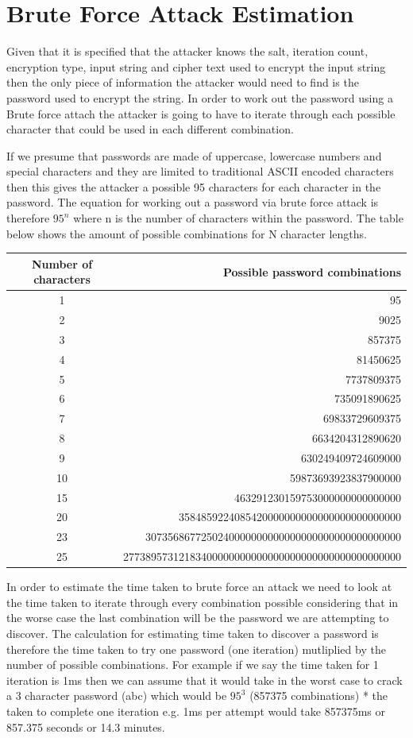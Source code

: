 \documentclass[a4paper, twoside, 11pt]{article}
\begin{document}
\section{Brute Force Attack Estimation}
Given that it is specified that the attacker knows the salt, iteration count, encryption type, 
input string and cipher text used to encrypt the input string then the only piece of information 
the attacker would need to find is the password used to encrypt the string. 
In order to work out the password using a Brute force attach the attacker is going to have to 
iterate through each possible character that could be used in each different combination.

If we presume that passwords are made of uppercase, lowercase numbers and special characters and they are
limited to traditional ASCII encoded characters then this gives the attacker a possible 95 characters for each character in the password.
The equation for working out a password via brute force attack is therefore $95^n$ where n is the number of characters within the password.
The table below shows the amount of possible combinations for N character lengths.

\begin{center}
	\begin{tabular}{ |c|r| } 
	 \hline
	 Number of characters & Possible password combinations \\
	 \hline
	 1 & 95 \\
	 2 & 9025 \\
	 3 & 857375 \\
	 4 & 81450625 \\
	 5 & 7737809375 \\
	 6 & 735091890625 \\
	 7 & 69833729609375 \\
	 8 & 6634204312890620 \\
	 9 & 630249409724609000 \\
	 10 & 59873693923837900000 \\
	 15 & 463291230159753000000000000000 \\
	 20 & 3584859224085420000000000000000000000000 \\
	 23 & 3073568677250240000000000000000000000000000000 \\
	 25 & 27738957312183400000000000000000000000000000000000  \\
	 \hline
	\end{tabular}
\end{center}

In order to estimate the time taken to brute force an attack we need to look at the time taken to iterate through every combination possible
 considering that in the worse case the last combination will be the password we are attempting to discover.
The calculation for estimating time taken to discover a password is therefore the time taken to try one password (one iteration)
 mutliplied by the number of possible combinations. For example if we say the time taken for 1 iteration is 1ms then we can assume that it
 would take in the worst case to crack a 3 character password (abc) which would be $95^3$ (857375 combinations) * the taken to complete one
 iteration e.g. 1ms per attempt would take 857375ms or 857.375 seconds or 14.3 minutes.
\end{document}
